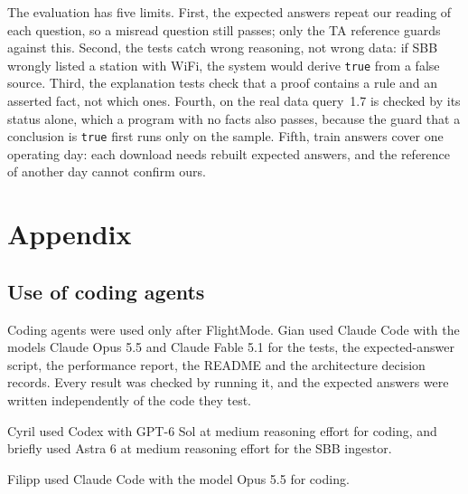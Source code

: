 \documentclass[10pt]{article}
\begin{document}
The evaluation has five limits. First, the expected answers repeat our reading of each question, so a misread question still passes; only the TA reference guards against this. Second, the tests catch wrong reasoning, not wrong data: if SBB wrongly listed a station with WiFi, the system would derive \texttt{true} from a false source. Third, the explanation tests check that a proof contains a rule and an asserted fact, not which ones. Fourth, on the real data query~1.7 is checked by its status alone, which a program with no facts also passes, because the guard that a conclusion is \texttt{true} first runs only on the sample. Fifth, train answers cover one operating day: each download needs rebuilt expected answers, and the reference of another day cannot confirm ours.




\appendix
\section{Appendix}

\subsection{Use of coding agents}
\label{app:agents}

Coding agents were used only after FlightMode. Gian used Claude Code with the models Claude Opus 5.5 and Claude Fable 5.1 for the tests, the expected-answer script, the performance report, the README and the architecture decision records. Every result was checked by running it, and the expected answers were written independently of the code they test.

Cyril used Codex with GPT-6 Sol at medium reasoning effort for coding, and briefly used Astra 6 at medium reasoning effort for the SBB ingestor.

Filipp used Claude Code with the model Opus 5.5 for coding.
\end{document}
